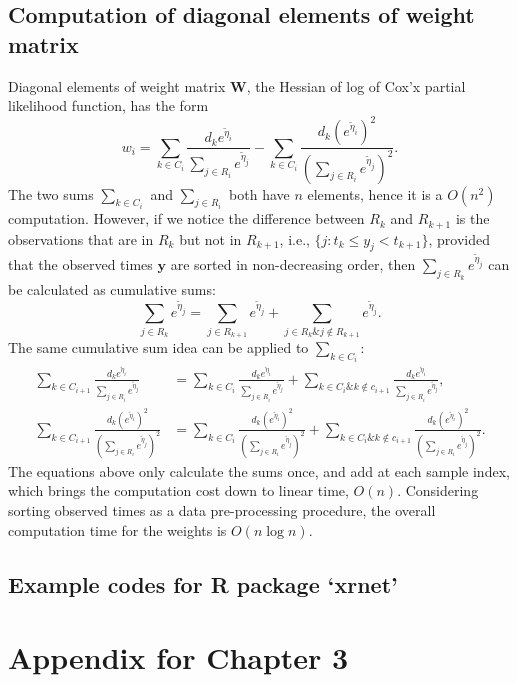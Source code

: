 \subsection{Computation of diagonal elements of weight matrix}
\label{a.3}
Diagonal elements of weight matrix $\bm{W}$, the Hessian of log of Cox'x partial likelihood function, has the form 
\begin{displaymath}
w_i=\sum_{k\in C_i}\frac{d_k e^{\tilde{\eta}_i}}{\sum_{j\in R_i}e^{\tilde{\eta}_j}}-\sum_{k\in C_i}\frac{d_k (e^{\tilde{\eta}_i})^2}{(\sum_{j\in R_i}e^{\tilde{\eta}_j})^2}. 
\end{displaymath}
The two sums $\sum_{k\in C_i}$ and $\sum_{j\in R_i}$ both have $n$ elements, hence it is a $O(n^2)$ computation. However, if we notice the difference between $R_k$ and $R_{k+1}$ is the observations that are in $R_k$ but not in $R_{k+1}$, i.e., $\{j:t_k\leq y_j < t_{k+1}\}$, provided that the observed times $\bm{y}$ are sorted in non-decreasing order, then $\sum_{j\in R_k}e^{\tilde{\eta}_j}$ can be calculated as cumulative sums:
\begin{displaymath}
\sum_{j\in R_k} e^{\tilde{\eta}_j} =\sum_{j\in R_{k+1}} e^{\tilde{\eta}_j}+ \sum_{j\in R_k \& j\notin R_{k+1}} e^{\tilde{\eta}_j}.
\end{displaymath}
The same cumulative sum idea can be applied to $\sum_{k\in C_i}$: 
\begin{align*}
    \sum_{k\in C_{i+1}}\frac{d_k e^{\tilde{\eta}_i}}{\sum_{j\in R_i}e^{\tilde{\eta}_j}}&=\sum_{k\in C_i}\frac{d_k e^{\tilde{\eta}_i}}{\sum_{j\in R_i}e^{\tilde{\eta}_j}}+\sum_{k\in C_i\&k\notin c_{i+1}}\frac{d_k e^{\tilde{\eta}_i}}{\sum_{j\in R_i}e^{\tilde{\eta}_j}}, \\
    \sum_{k\in C_{i+1}}\frac{d_k (e^{\tilde{\eta}_i})^2}{(\sum_{j\in R_i}e^{\tilde{\eta}_j})^2}&=\sum_{k\in C_i}\frac{d_k (e^{\tilde{\eta}_i})^2}{(\sum_{j\in R_i}e^{\tilde{\eta}_j})^2}+ \sum_{k\in C_i\&k\notin c_{i+1}}\frac{d_k (e^{\tilde{\eta}_i})^2}{(\sum_{j\in R_i}e^{\tilde{\eta}_j})^2}.
\end{align*}
The equations above only calculate the sums once, and add at each sample index, which brings the computation cost down to linear time, $O(n)$. Considering sorting observed times as a data pre-processing procedure, the overall computation time for the weights is $O(n\log n)$. 


\subsection{Example codes for R package `xrnet'}
\label{a.4}

\section{Appendix for Chapter 3}
